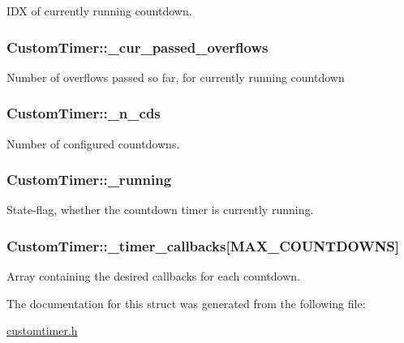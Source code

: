 I\-D\-X of currently running countdown. \hypertarget{structCustomTimer_ad15fa895447acab30d432060384580da}{
\subsubsection[{\-\_\-cur\-\_\-passed\-\_\-overflows}]{ Custom\-Timer\-::\-\_\-cur\-\_\-passed\-\_\-overflows}}\label{structCustomTimer_ad15fa895447acab30d432060384580da}
Number of overflows passed so far, for currently running countdown \hypertarget{structCustomTimer_a62c65f1d0a0d390f50345ecd0f9a7271}{
\subsubsection[{\-\_\-n\-\_\-cds}]{ Custom\-Timer\-::\-\_\-n\-\_\-cds}}\label{structCustomTimer_a62c65f1d0a0d390f50345ecd0f9a7271}
Number of configured countdowns. \hypertarget{structCustomTimer_a8812f98379da20ef638a8f4e3e2986e8}{
\subsubsection[{\-\_\-running}]{ Custom\-Timer\-::\-\_\-running}}\label{structCustomTimer_a8812f98379da20ef638a8f4e3e2986e8}
State-\/flag, whether the countdown timer is currently running. \hypertarget{structCustomTimer_a50e4108790b76dc45bdc008ee86dd94c}{
\subsubsection[{\-\_\-timer\-\_\-callbacks}]{ Custom\-Timer\-::\-\_\-timer\-\_\-callbacks\mbox{[}{\bf M\-A\-X\-\_\-\-C\-O\-U\-N\-T\-D\-O\-W\-N\-S}\mbox{]}}}\label{structCustomTimer_a50e4108790b76dc45bdc008ee86dd94c}
Array containing the desired callbacks for each countdown. 

The documentation for this struct was generated from the following file\-:\begin{DoxyCompactItemize}
\item 
\hyperlink{customtimer_8h}{customtimer.\-h}\end{DoxyCompactItemize}
